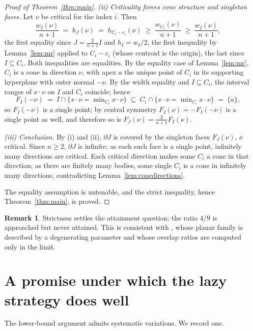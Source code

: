 \documentclass[12pt]{article}
\theoremstyle{definition}
\newtheorem{remark}[theorem]{Remark}
\begin{document}
\begin{proof}[Proof of Theorem~\ref{thm:main}]
\smallskip\noindent
{\em (ii) Criticality forces cone structure and singleton faces.}
Let $\nu$ be critical for the index $i$.  Then
\[
\frac{w_I(\nu)}{n+1}\;=\;h_J(\nu)\;=\;h_{C_i-c_i}(\nu)
\;\ge\;\frac{w_{C_i}(\nu)}{n+1}\;\ge\;\frac{w_I(\nu)}{n+1},
\]
the first equality since $J=\frac{2}{n+1}I$ and $h_I=w_I/2$, the first
inequality by Lemma~\ref{lem:mr} applied to $C_i-c_i$ (whose centroid is
the origin), the last since $I\subseteq C_i$.  Both inequalities are
equalities.  By the equality case of Lemma~\ref{lem:mr}, $C_i$ is a
cone in direction $\nu$, with apex $a$ the unique point of $C_i$ in its
supporting hyperplane with outer normal $-\nu$.  By the width equality
and $I\subseteq C_i$, the interval ranges of $x\cdot\nu$ on $I$ and
$C_i$ coincide; hence
\[
F_I(-\nu)\;=\;I\cap\{x\cdot\nu=\min\nolimits_{C_i}x\cdot\nu\}
\;\subseteq\;C_i\cap\{x\cdot\nu=\min\nolimits_{C_i}x\cdot\nu\}
\;=\;\{a\},
\]
so $F_I(-\nu)$ is a single point; by central symmetry
$F_I(\nu)=-F_I(-\nu)$ is a single point as well, and therefore so is
$F_J(\nu)=\frac{2}{n+1}F_I(\nu)$.

\smallskip\noindent
{\em (iii) Conclusion.}
By (i) and (ii), $\partial J$ is covered by the singleton faces
$F_J(\nu)$, $\nu$ critical.  Since $n\ge 2$, $\partial J$ is infinite; as
each such face is a single point, infinitely many directions are critical.  Each
critical direction makes some $C_i$ a cone in that direction; as there
are finitely many bodies, some single $C_i$ is a cone in infinitely
many directions, contradicting Lemma~\ref{lem:conedirections}.

The equality assumption is untenable, and the strict inequality, hence
Theorem~\ref{thm:main}, is proved.
\end{proof}

\begin{remark}
Strictness settles the attainment question: the ratio $4/9$ is approached
but never attained.  This is consistent with \cite{deberg}, whose planar
family is described by a degenerating parameter and whose overlap ratios
are computed only in the limit.
\end{remark}

\section{A promise under which the lazy strategy does well}
\label{sec:promise}

The lower-bound argument admits systematic variations.  We record one.
\end{document}
